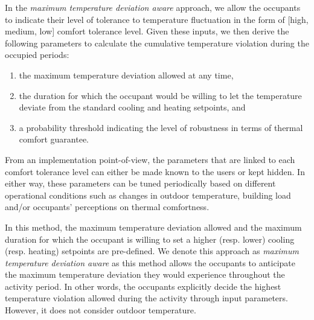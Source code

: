 In the \emph{\textsl{maximum temperature deviation aware}} approach, we allow the occupants to indicate their level of tolerance to temperature fluctuation in the form of [high, medium, low] comfort tolerance level. Given these inputs, we then derive the following parameters to calculate the cumulative temperature violation during the occupied periods:
\begin{enumerate}	
	\item the maximum temperature deviation allowed at any time, 
	\item the duration for which the occupant would be willing to let the temperature deviate from the standard cooling and heating setpoints, and
	\item a probability threshold indicating the level of robustness in terms of thermal comfort guarantee.
\end{enumerate}
From an implementation point-of-view, the parameters that are linked to each comfort tolerance level can either be made known to the users or kept hidden. In either way, these parameters can be tuned periodically based on different operational conditions such as changes in outdoor temperature, building load and/or occupants' perceptions on thermal comfortness.

In this method, the maximum temperature deviation allowed and the maximum duration for which the occupant is willing to set a higher (resp. lower) cooling (resp. heating) setpoints are pre-defined. We denote this approach as \emph{\textsl{maximum temperature deviation aware}} as this method allows the occupants to anticipate the maximum temperature deviation they would experience throughout the activity period. In other words, the occupants explicitly decide the highest temperature violation allowed during the activity through input parameters. However, it does not consider outdoor temperature. 


